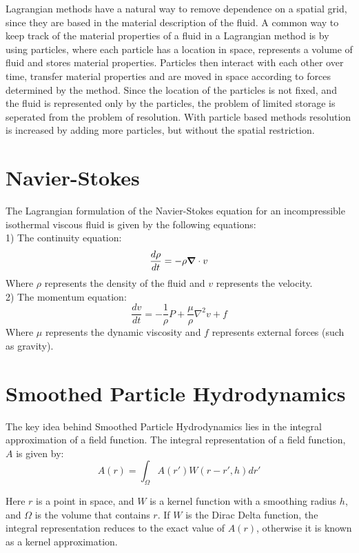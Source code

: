 Lagrangian methods have a natural way to remove dependence on a spatial grid,
since they are based in the material description of the fluid. A common way to
keep track of the material properties of a fluid in a Lagrangian method is by
using particles, where each particle has a location in space, represents a
volume of fluid and stores material properties. Particles then interact with
each other over time, transfer material properties and are moved in space
according to forces determined by the method. Since the location of the
particles is not fixed, and the fluid is represented only by the particles, the
problem of limited storage is seperated from the problem of resolution. With
particle based methods resolution is increased by adding more particles, but
without the spatial restriction.



\section{Navier-Stokes}

The Lagrangian formulation of the Navier-Stokes equation for an incompressible
isothermal viscous fluid is given by the following equations: \\
1) The continuity equation:
$$
\frac{d\rho}{dt} = -\rho \mbox{\boldmath$ \nabla $} \cdot v
$$
Where $\rho$ represents the density of the fluid and $v$ represents the velocity.\\


2) The momentum equation:
$$
\frac{dv}{dt} = -\frac{1}{\rho}P + \frac{\mu}{\rho} \nabla^2 v + f
$$
Where $\mu$ represents the dynamic viscosity and $f$ represents external forces (such as gravity).


\section{Smoothed Particle Hydrodynamics}


The key idea behind Smoothed Particle Hydrodynamics lies in the integral
approximation of a field function. The integral representation of a field
function, $A$ is given by: 
$$
A(r) = \int_\Omega A(r')W(r-r', h)dr'
$$

Here $r$ is a point in space, and $W$ is a kernel function with a smoothing radius
$h$, and $\Omega$ is the volume that contains $r$. If $W$ is the Dirac Delta
function, the integral representation reduces to the exact value of $A(r)$,
otherwise it is known as a kernel approximation.

